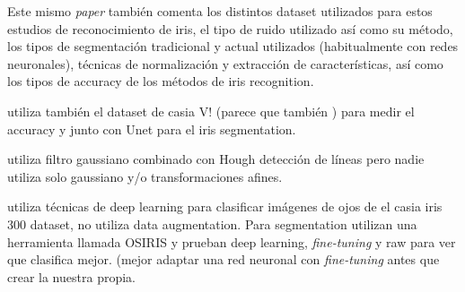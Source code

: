  Este mismo \textit{paper} también comenta los distintos dataset utilizados para estos estudios de reconocimiento de iris, el tipo de ruido utilizado así como su método,
 los tipos de segmentación tradicional y actual utilizados (habitualmente con redes neuronales), técnicas de normalización y extracción de características, así 
 como los tipos de accuracy de los métodos de iris recognition.

 \cite{DeMarsico2016IrisRT} utiliza también el dataset de casia V! (parece que también \cite{10.1016/j.cogsys.2018.09.029}) para medir el accuracy y \cite{lozej_end--end_2018} junto con Unet para el
 iris segmentation.

 \cite{7498983} utiliza filtro gaussiano combinado con Hough detección de líneas pero nadie utiliza solo gaussiano y/o transformaciones afines.

 \cite{boyd_deep_2020} utiliza técnicas de deep learning para clasificar imágenes de ojos de el casia iris 300 dataset, no utiliza data augmentation. Para segmentation utilizan una herramienta
 llamada OSIRIS y prueban deep learning, \textit{fine-tuning} y raw para ver que clasifica mejor. (mejor adaptar una red neuronal con \textit{fine-tuning} antes que crear la nuestra propia.

